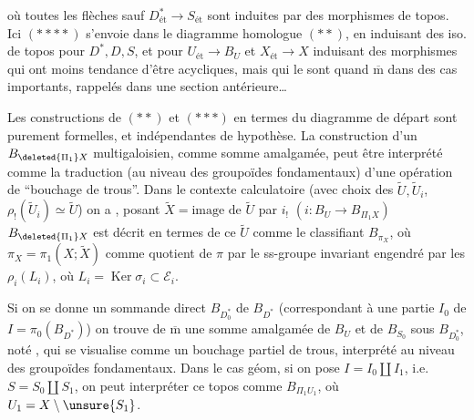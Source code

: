 où toutes les flèches sauf $D^*_{\text{ét}}\longrightarrow S_{\text{ét}}$ sont induites par des morphismes de topos.
Ici $(****)$ s'envoie dans le diagramme homologue $(**)$, en induisant des iso. de topos pour $D^*,D,S$, et pour $U_{\text{ét}}\longrightarrow B_U$ et $X_{\text{ét}}\longrightarrow X$ induisant des morphismes qui ont moins tendance d'être acycliques, mais qui le sont  quand $\overline{\mathrm m}$ dans des cas importants, rappelés dans une section antérieure\ldots

Les constructions de $(**)$ et $(***)$ en termes du diagramme de départ
sont purement formelles, et indépendantes de  hypothèse.
La construction d'un $B_{\deleted{\Pi_1}X}$ multigaloisien, comme somme amalgamée, peut être interprété comme la traduction (au niveau des groupoïdes fondamentaux) d'une opération de ``bouchage de trous''.
 Dans le contexte calculatoire
(avec choix des $\widetilde U,\widetilde U_i$, $\rho_!(\widetilde U_i)\simeq\widetilde U$) on a
,
posant $\widetilde X=\text{image de }\widetilde U$ par $i_!$ $(i:B_U\longrightarrow B_{\Pi_1 X})$ $B_{\deleted{\Pi_1}X}$ est décrit en termes de ce $\widetilde U$ comme le  classifiant $B_{\pi_X}$, où $\pi_X=\pi_1(X;\widetilde X)$   comme quotient de $\pi$ par le ss-groupe invariant engendré par les $\rho_i(L_i)$, où $L_i=\operatorname{Ker}\sigma_i\subset\mathcal E_i$.

Si on se donne un sommande direct $B_{D_0^*}$ de $B_{D^*}$ (correspondant à une partie $I_0$ de $I=\pi_0(B_{D^*})$) on trouve de $\overline{\mathrm m}$ une somme amalgamée de $B_U$ et de $B_{S_0}$ sous $B_{D_0^*}$, noté  , qui se visualise comme un bouchage partiel de trous, interprété au niveau des groupoïdes fondamentaux. Dans le cas géom, si on pose $I=I_0\amalg I_1$, i.e. $S=S_0\amalg S_1$, on
peut interpréter ce topos comme $B_{\Pi_1 U_1}$, où $U_1=X\setminus\unsure{S_1}$. 

